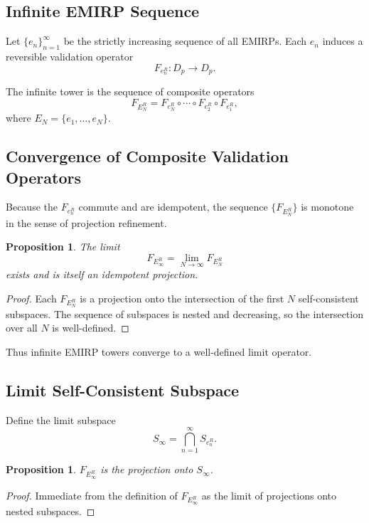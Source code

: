 \documentclass[11pt]{article}
\theoremstyle{definition}
\theoremstyle{plain}
\newtheorem{proposition}[definition]{Proposition}
\theoremstyle{remark}
\begin{document}
\subsection{Infinite EMIRP Sequence}

Let $\{e_n\}_{n=1}^\infty$ be the strictly increasing sequence of all
EMIRPs. Each $e_n$ induces a reversible validation operator
\[
F_{e_n^R} : D_p \to D_p.
\]

The infinite tower is the sequence of composite operators
\[
F_{E_N^R} = F_{e_N^R} \circ \cdots \circ F_{e_2^R} \circ F_{e_1^R},
\]
where $E_N = \{e_1,\dots,e_N\}$.

\subsection{Convergence of Composite Validation Operators}

Because the $F_{e_n^R}$ commute and are idempotent, the sequence
$\{F_{E_N^R}\}$ is monotone in the sense of projection refinement.

\begin{proposition}
The limit
\[
F_{E_\infty^R} = \lim_{N \to \infty} F_{E_N^R}
\]
exists and is itself an idempotent projection.
\end{proposition}

\begin{proof}
Each $F_{E_N^R}$ is a projection onto the intersection of the first $N$
self-consistent subspaces. The sequence of subspaces is nested and
decreasing, so the intersection over all $N$ is well-defined.
\end{proof}

Thus infinite EMIRP towers converge to a well-defined limit operator.

\subsection{Limit Self-Consistent Subspace}

Define the limit subspace
\[
S_\infty = \bigcap_{n=1}^\infty S_{e_n^R}.
\]

\begin{proposition}
$F_{E_\infty^R}$ is the projection onto $S_\infty$.
\end{proposition}

\begin{proof}
Immediate from the definition of $F_{E_\infty^R}$ as the limit of
projections onto nested subspaces.
\end{proof}
\end{document}
